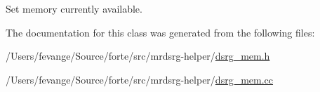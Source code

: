 Set memory currently available. 



The documentation for this class was generated from the following files\+:\begin{DoxyCompactItemize}
\item 
/\+Users/fevange/\+Source/forte/src/mrdsrg-\/helper/\mbox{\hyperlink{dsrg__mem_8h}{dsrg\+\_\+mem.\+h}}\item 
/\+Users/fevange/\+Source/forte/src/mrdsrg-\/helper/\mbox{\hyperlink{dsrg__mem_8cc}{dsrg\+\_\+mem.\+cc}}\end{DoxyCompactItemize}
